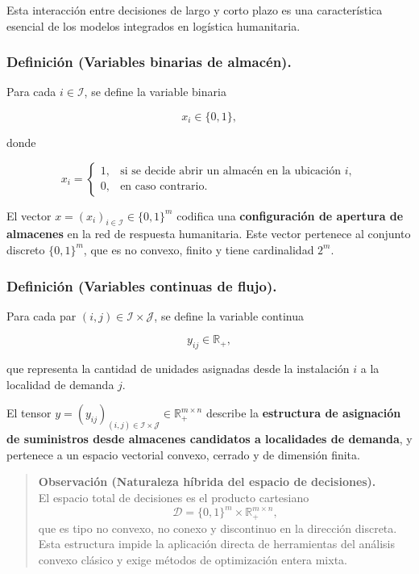 \documentclass[
  spanish,
  us-letterpaper,
  DIV=11,
  numbers=noendperiod]{scrreprt}
\numberwithin{equation}{section}
\begin{document}
Esta interacción entre decisiones de largo y corto plazo es una
característica esencial de los modelos integrados en logística
humanitaria.

\subsubsection{\texorpdfstring{\textbf{Definición (Variables binarias de
almacén).}}{Definición (Variables binarias de almacén).}}\label{definiciuxf3n-variables-binarias-de-almacuxe9n.}

Para cada \(i \in \mathcal{I}\), se define la variable binaria

\[
x_i \in \{0,1\},
\]

donde

\[
x_i =
\begin{cases}
1, & \text{si se decide abrir un almacén en la ubicación } i, \\
0, & \text{en caso contrario}.
\end{cases}
\]

El vector \(x = (x_i)_{i \in \mathcal{I}} \in \{0,1\}^m\) codifica una
\textbf{configuración de apertura de almacenes} en la red de respuesta
humanitaria. Este vector pertenece al conjunto discreto \(\{0,1\}^m\),
que es no convexo, finito y tiene cardinalidad \(2^m\).

\subsubsection{\texorpdfstring{\textbf{Definición (Variables continuas
de
flujo).}}{Definición (Variables continuas de flujo).}}\label{definiciuxf3n-variables-continuas-de-flujo.}

Para cada par \((i,j) \in \mathcal{I} \times \mathcal{J}\), se define la
variable continua

\[
y_{ij} \in \mathbb{R}_+,
\]

que representa la cantidad de unidades asignadas desde la instalación
\(i\) a la localidad de demanda \(j\).

El tensor
\(y = (y_{ij})_{(i,j) \in \mathcal{I} \times \mathcal{J}} \in \mathbb{R}_+^{m \times n}\)
describe la \textbf{estructura de asignación de suministros desde
almacenes candidatos a localidades de demanda}, y pertenece a un espacio
vectorial convexo, cerrado y de dimensión finita.

\begin{quote}
\textbf{Observación (Naturaleza híbrida del espacio de decisiones).}\\
El espacio total de decisiones es el producto cartesiano\\
\[
\mathcal{D} = \{0,1\}^m \times \mathbb{R}_+^{m \times n},
\] que es tipo no convexo, no conexo y discontinuo en la dirección
discreta. Esta estructura impide la aplicación directa de herramientas
del análisis convexo clásico y exige métodos de optimización entera
mixta.
\end{quote}
\end{document}
